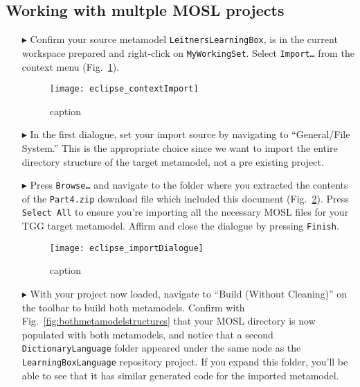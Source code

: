 \newpage
\hypertarget{multiMOSL}{}
\subsection{Working with multple MOSL projects}
\texHeader

\begin{itemize}

\item[$\blacktriangleright$] Confirm your source metamodel \texttt{LeitnersLearningBox}, is in the current workspace prepared and right-click on
\texttt{MyWorkingSet}. Select \texttt{Import\ldots} from the context menu (Fig.~\ref{fig:eclipseContextImport}).

\vspace{0.25cm}

\begin{figure}[htbp]
\begin{center}
  \texttt{[image: eclipse\_contextImport]}
  \caption{caption}
  \label{fig:eclipseContextImport}
\end{center}
\end{figure}

\item[$\blacktriangleright$] In the first dialogue, set your import source by navigating to ``General/File System.'' This is the appropriate choice since
we want to import the entire directory structure of the target metamodel, not a pre existing project.

\item[$\blacktriangleright$] Press \texttt{Browse\ldots} and navigate to the folder where you extracted the contents of the \texttt{Part4.zip} download file
which included this document (Fig.~\ref{fig:importFileSys}). Press \texttt{Select All} to ensure you're importing all the necessary MOSL files for your TGG
target metamodel. Affirm and close the dialogue by pressing \texttt{Finish}.

\newpage

\begin{figure}[htbp]
\begin{center}
  \texttt{[image: eclipse\_importDialogue]}
  \caption{caption}
  \label{fig:importFileSys}
\end{center}
\end{figure}

\item[$\blacktriangleright$] With your project now loaded, navigate to ``Build (Without Cleaning)'' on the toolbar to build both metamodels. Confirm with
Fig.~\ref{fig:bothmetamodelstructures} that your MOSL directory is now populated with both metamodels, and notice that a second \texttt{Dictionary\-Language}
folder appeared under the same node as the \texttt{LearningBoxLanguage} repository project. If you expand this folder, you'll be able to see that it has
similar generated code for the imported metamodel.


\end{itemize}
